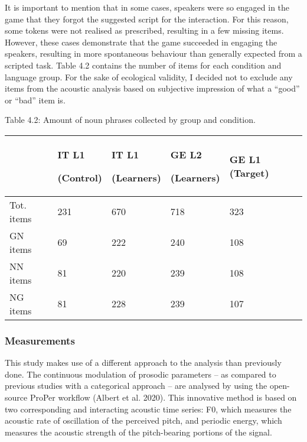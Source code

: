 \begin{styleStandard}
It is important to mention that in some cases, speakers were so engaged in the game that they forgot the suggested script for the interaction. For this reason, some tokens were not realised as prescribed, resulting in a few missing items. However, these cases demonstrate that the game succeeded in engaging the speakers, resulting in more spontaneous behaviour than generally expected from a scripted task. Table 4.2 contains the number of items for each condition and language group. For the sake of ecological validity, I decided not to exclude any items from the acoustic analysis based on subjective impression of what a “good” or “bad” item is.
\end{styleStandard}

\begin{stylelsTableHeading}
Table 4.2: Amount of noun phrases collected by group and condition.
\end{stylelsTableHeading}

\begin{flushleft}
\tablefirsthead{}
\tablehead{}
\tabletail{}
\tablelasttail{}
\begin{supertabular}{m{0.82685983in}m{0.82685983in}m{0.82685983in}m{0.82685983in}m{0.8275598in}}
\hline
 &
IT L1 

(Control) &
IT L1 

(Learners) &
GE L2 

(Learners) &
GE L1 (Target)\\\hline
Tot. items &
231 &
670 &
718 &
323\\
GN items &
69 &
222 &
240 &
108\\
NN items &
81 &
220 &
239 &
108\\
NG items &
81 &
228 &
239 &
107\\\hline
\end{supertabular}
\end{flushleft}
\subsubsection[]{}
\subsubsection{Measurements}
\hypertarget{Toc191305894}{}\begin{styleStandard}
This study makes use of a different approach to the analysis than previously done. The continuous modulation of prosodic parameters – as compared to previous studies with a categorical approach – are analysed by using the open-source ProPer workflow (Albert et al. 2020). This innovative method is based on two corresponding and interacting acoustic time series: F0, which measures the acoustic rate of oscillation of the perceived pitch, and periodic energy, which measures the acoustic strength of the pitch-bearing portions of the signal. 
\end{styleStandard}

